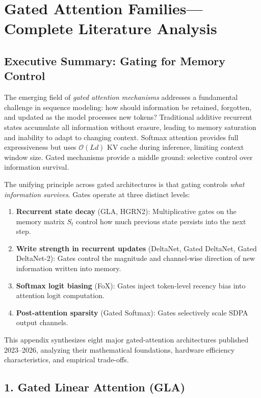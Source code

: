 \section{Gated Attention Families---Complete Literature Analysis}
\label{sec:annex-gated}

\subsection{Executive Summary: Gating for Memory Control}

The emerging field of \emph{gated attention mechanisms} addresses a fundamental challenge in sequence modeling: how should information be retained, forgotten, and updated as the model processes new tokens? Traditional additive recurrent states accumulate all information without erasure, leading to memory saturation and inability to adapt to changing context. Softmax attention provides full expressiveness but uses $\mathcal{O}(Ld)$ KV cache during inference, limiting context window size. Gated mechanisms provide a middle ground: selective control over information survival.

The unifying principle across gated architectures is that gating controls \textit{what information survives}. Gates operate at three distinct levels:
\begin{enumerate}[leftmargin=*]
    \item \textbf{Recurrent state decay} (GLA, HGRN2): Multiplicative gates on the memory matrix $S_t$ control how much previous state persists into the next step.
    \item \textbf{Write strength in recurrent updates} (DeltaNet, Gated DeltaNet, Gated DeltaNet-2): Gates control the magnitude and channel-wise direction of new information written into memory.
    \item \textbf{Softmax logit biasing} (FoX): Gates inject token-level recency bias into attention logit computation.
    \item \textbf{Post-attention sparsity} (Gated Softmax): Gates selectively scale SDPA output channels.
\end{enumerate}

This appendix synthesizes eight major gated-attention architectures published 2023--2026, analyzing their mathematical foundations, hardware efficiency characteristics, and empirical trade-offs.

\subsection{1. Gated Linear Attention (GLA)}

